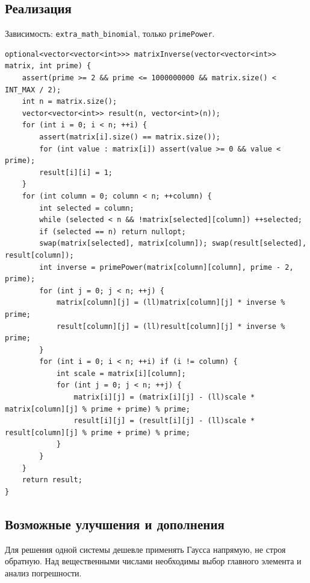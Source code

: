 \subsection*{Реализация}
Зависимость: \texttt{extra\_math\_binomial}, только \texttt{primePower}.
\begin{lstlisting}[name=extra_math_matrix_inverse]
optional<vector<vector<int>>> matrixInverse(vector<vector<int>> matrix, int prime) {
    assert(prime >= 2 && prime <= 1000000000 && matrix.size() < INT_MAX / 2);
    int n = matrix.size();
    vector<vector<int>> result(n, vector<int>(n));
    for (int i = 0; i < n; ++i) {
        assert(matrix[i].size() == matrix.size());
        for (int value : matrix[i]) assert(value >= 0 && value < prime);
        result[i][i] = 1;
    }
    for (int column = 0; column < n; ++column) {
        int selected = column;
        while (selected < n && !matrix[selected][column]) ++selected;
        if (selected == n) return nullopt;
        swap(matrix[selected], matrix[column]); swap(result[selected], result[column]);
        int inverse = primePower(matrix[column][column], prime - 2, prime);
        for (int j = 0; j < n; ++j) {
            matrix[column][j] = (ll)matrix[column][j] * inverse % prime;
            result[column][j] = (ll)result[column][j] * inverse % prime;
        }
        for (int i = 0; i < n; ++i) if (i != column) {
            int scale = matrix[i][column];
            for (int j = 0; j < n; ++j) {
                matrix[i][j] = (matrix[i][j] - (ll)scale * matrix[column][j] % prime + prime) % prime;
                result[i][j] = (result[i][j] - (ll)scale * result[column][j] % prime + prime) % prime;
            }
        }
    }
    return result;
}
\end{lstlisting}
\subsection*{Возможные улучшения и дополнения}
Для решения одной системы дешевле применять Гаусса напрямую, не строя обратную.
Над вещественными числами необходимы выбор главного элемента и анализ погрешности.


\fi
